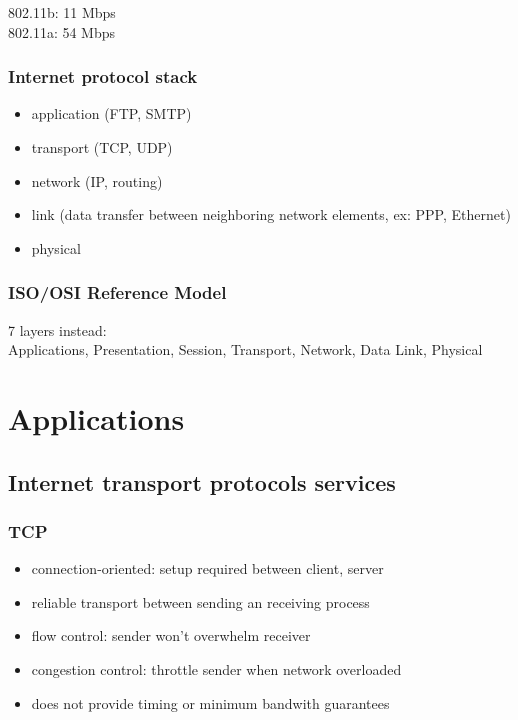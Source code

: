 \documentclass[10pt, a4paper, twocolumn]{scrartcl}
\begin{document}
802.11b: 11 Mbps\\
802.11a: 54 Mbps

\subsubsection{Internet protocol stack}

\begin{itemize}
	\item application (FTP, SMTP)
	\item transport (TCP, UDP)
	\item network (IP, routing)
	\item link (data transfer between neighboring network elements, ex: PPP, Ethernet)
	\item physical
\end{itemize}

\subsubsection{ISO/OSI Reference Model}

7 layers instead:\\
Applications, Presentation, Session, Transport, Network, Data Link, Physical

\section{Applications}

\subsection{Internet transport protocols services}

\subsubsection{TCP}

\begin{itemize}
	\item connection-oriented: setup required between client, server
	\item reliable transport between sending an receiving process
	\item flow control: sender won't overwhelm receiver
	\item congestion control: throttle sender when network overloaded
	\item does not provide timing or minimum bandwith guarantees
\end{itemize}
\end{document}
